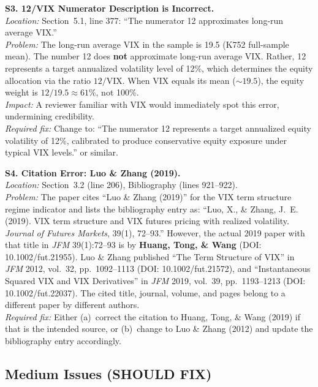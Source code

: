 \documentclass[12pt,a4paper]{article}
\begin{document}
\bigskip

\textbf{S3. 12/VIX Numerator Description is Incorrect.}\\
\textit{Location:} Section~5.1, line 377: ``The numerator 12 approximates long-run average VIX.''\\
\textit{Problem:} The long-run average VIX in the sample is 19.5 (K752 full-sample mean). The number 12 does \textbf{not} approximate long-run average VIX. Rather, 12 represents a target annualized volatility level of 12\%, which determines the equity allocation via the ratio $12/\text{VIX}$. When VIX equals its mean ($\sim 19.5$), the equity weight is $12/19.5 \approx 61\%$, not 100\%.\\
\textit{Impact:} A reviewer familiar with VIX would immediately spot this error, undermining credibility.\\
\textit{Required fix:} Change to: ``The numerator 12 represents a target annualized equity volatility of 12\%, calibrated to produce conservative equity exposure under typical VIX levels.'' or similar.

\bigskip

\textbf{S4. Citation Error: Luo \& Zhang (2019).}\\
\textit{Location:} Section~3.2 (line 206), Bibliography (lines 921--922).\\
\textit{Problem:} The paper cites ``Luo \& Zhang (2019)'' for the VIX term structure regime indicator and lists the bibliography entry as: ``Luo, X., \& Zhang, J.~E. (2019). VIX term structure and VIX futures pricing with realized volatility. \textit{Journal of Futures Markets}, 39(1), 72--93.'' However, the actual 2019 paper with that title in \textit{JFM} 39(1):72--93 is by \textbf{Huang, Tong, \& Wang} (DOI: 10.1002/fut.21955). Luo \& Zhang published ``The Term Structure of VIX'' in \textit{JFM} 2012, vol.~32, pp.~1092--1113 (DOI: 10.1002/fut.21572), and ``Instantaneous Squared VIX and VIX Derivatives'' in \textit{JFM} 2019, vol.~39, pp.~1193--1213 (DOI: 10.1002/fut.22037). The cited title, journal, volume, and pages belong to a different paper by different authors.\\
\textit{Required fix:} Either (a)~correct the citation to Huang, Tong, \& Wang (2019) if that is the intended source, or (b)~change to Luo \& Zhang (2012) and update the bibliography entry accordingly.


\subsection*{\textcolor{warncolor}{Medium Issues (SHOULD FIX)}}
\end{document}
